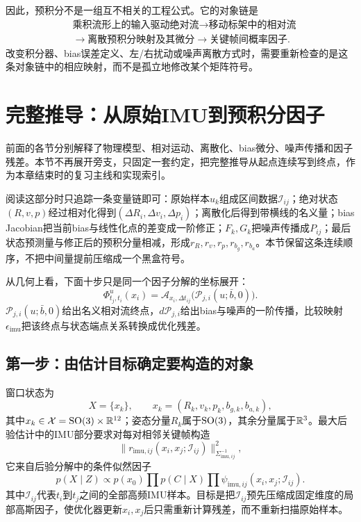 因此，预积分不是一组互不相关的工程公式。它的对象链是
\[
\boxed{
\begin{aligned}
&\text{乘积流形上的输入驱动绝对流}
\longrightarrow
\text{移动标架中的相对流}\\
&\longrightarrow
\text{离散预积分映射及其微分}
\longrightarrow
\text{关键帧间概率因子}.
\end{aligned}
}
\]
改变积分器、bias误差定义、左/右扰动或噪声离散方式时，需要重新检查的是这条对象链中的相应映射，而不是孤立地修改某个矩阵符号。

\section{完整推导：从原始IMU到预积分因子}

前面的各节分别解释了物理模型、相对运动、离散化、bias微分、噪声传播和因子残差。本节不再展开旁支，只固定一套约定，把完整推导从起点连续写到终点，作为本章结束时的复习主线和实现索引。

阅读这部分时只追踪一条变量链即可：原始样本$u_k$组成区间数据$\mathcal I_{ij}$；绝对状态$(R,v,p)$经过相对化得到$(\Delta R_i,\Delta v_i,\Delta p_i)$；离散化后得到带横线的名义量；bias Jacobian把当前bias与线性化点的差变成一阶修正；$F_k,G_k$把噪声传播成$P_{ij}$；最后状态预测量与修正后的预积分量相减，形成$r_R,r_v,r_p,r_{b_g},r_{b_a}$。本节保留这条连续顺序，不把中间量提前压缩成一个黑盒符号。

从几何上看，下面十步只是同一个因子分解的坐标展开：
\[
    \Phi^u_{t_j,t_i}(x_i)
    =\mathcal A_{x_i,\Delta t_{ij}}
      \bigl(\mathcal P_{j,i}(u;\bar b,0)\bigr).
\]
$\mathcal P_{j,i}(u;\bar b,0)$给出名义相对流终点，$d\mathcal P_{j,i}$给出bias与噪声的一阶传播，比较映射$\epsilon_{\mathrm{imu}}$把该终点与状态端点关系转换成优化残差。

\subsection*{第一步：由估计目标确定要构造的对象}

窗口状态为
\[
    X=\{x_k\},
    \qquad
    x_k=(R_k,v_k,p_k,b_{g,k},b_{a,k}),
\]
其中$x_k\in\mathcal X=\operatorname{SO}(3)\times\mathbb{R}^{12}$；姿态分量$R_k$属于$\operatorname{SO}(3)$，其余分量属于$\mathbb{R}^3$。最大后验估计中的IMU部分要求对每对相邻关键帧构造
\[
    \|r_{\mathrm{imu},ij}(x_i,x_j;\mathcal I_{ij})\|_{\Sigma_{\mathrm{imu},ij}^{-1}}^2,
\]
它来自后验分解中的条件似然因子
\[
    p(X\mid Z)
    \propto p(x_0)
    \prod p(C\mid X)
    \prod \psi_{\mathrm{imu},ij}(x_i,x_j;\mathcal I_{ij}).
\]
其中$\mathcal I_{ij}$代表$t_i$到$t_j$之间的全部高频IMU样本。目标是把$\mathcal I_{ij}$预先压缩成固定维度的局部高斯因子，使优化器更新$x_i,x_j$后只需重新计算残差，而不重新扫描原始样本。

